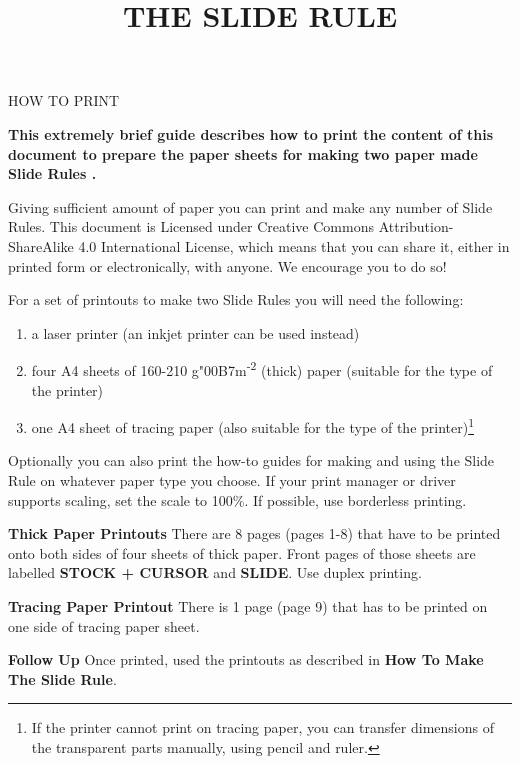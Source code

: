 
\newcommand{\makefulltitle}{How To Print The Slide Rule }



\title{\fontsize{60}{60}\selectfont THE SLIDE RULE}
\preauthor{}\postauthor{}\author{}
\predate{}\postdate{}\date{}


  \begin{center}
    \headingfont\fontsize{20}{20}\selectfont HOW TO PRINT
  \end{center}

  {\let\newpage\relax\maketitle}%
  \nosection{}
  \large\textbf{\makeperex This extremely brief guide describes how to print the content of this document to prepare the paper sheets for making two paper made Slide Rules \modelname.}

  \begin{multicols*}{3}
  \normalsize{

  Giving sufficient amount of paper you can print and make any number of Slide Rules. This document is Licensed under Creative Commons Attribution-ShareAlike 4.0 International License, which means that you can share it, either in printed form or electronically, with anyone. We encourage you to do so!

  For a set of printouts to make two Slide Rules you will need the following:
    \begin{enumerate}
      \setlength{\parskip}{0pt}
      \setlength{\parsep}{0pt}
      \item a laser printer (an inkjet printer can be used instead)
      \item four A4 sheets of 160-210 g{\char"00B7}m\textsuperscript{-2} (thick) paper (suitable for the type of the printer)
      \item one A4 sheet of tracing paper (also suitable for the type of the printer)\footnote{If the printer cannot print on tracing paper, you can transfer dimensions of the transparent parts manually, using pencil and ruler.}
    \end{enumerate}

  Optionally you can also print the how-to guides for making and using the Slide Rule on whatever paper type you choose. If your print manager or driver supports scaling, set the scale to 100\%. If possible, use borderless printing.

  \textbf{Thick Paper Printouts}
There are 8 pages (pages 1-8) that have to be printed onto both sides of four sheets of thick paper. Front pages of those sheets are labelled \textbf{STOCK + CURSOR} and \textbf{SLIDE}. Use duplex printing.

  \textbf{Tracing Paper Printout}
There is 1 page (page 9) that has to be printed on one side of tracing paper sheet.

  \textbf{Follow Up}
Once printed, used the printouts as described in \textbf{How To Make The Slide Rule}.

  }
  \end{multicols*}


